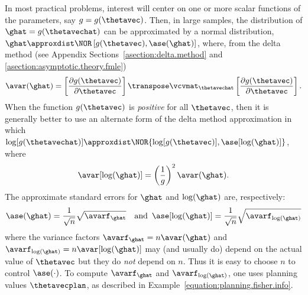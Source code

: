 In most practical problems, interest will center on one or more
scalar functions of the parameters, say $g=g(\thetavec)$.  Then, in
large samples, the distribution of $\ghat=g(\thetavechat)$ can be
approximated by a normal distribution, $\ghat \approxdist
\NOR \,[g(\thetavec), \ase(\ghat)]$,
where, from the delta method 
(see Appendix Sections~\ref{asection:delta.method}
and \ref{asection:asymptotic.theory.fmle})
\begin{equation}
\label{equation:planning.avar.fun}
 \avar(\ghat)=
\left [\frac{\partial g(\thetavec)}{\partial \thetavec }
 \right ] \transpose \vcvmat_{\thetavechat}
\left [\frac{\partial g(\thetavec)}{\partial \thetavec } \right ].
\end{equation}
When the function $g(\thetavec)$ is {\em positive} for all
$\thetavec$, then it is generally better to use an alternate form of
the delta method approximation in which $\log[g(\thetavechat)]
\approxdist
\NOR \{\log[g(\thetavec)], \ase[\log(\ghat)]\}$,
where 
\begin{displaymath}
\avar[\log(\ghat)]=\left (\frac{1}{g} \right )^{2}
\avar(\ghat).
\end{displaymath}
The approximate standard errors for $\ghat$
and $\log(\ghat)$ are, respectively:
\begin{eqnarray*}
\ase(\ghat)=\frac{1}{\sqrt{n}} \sqrt{\avarf_{\ghat}} \quad \mbox{and}
\,\,\, \ase[\log(\ghat)]=\frac{1}{\sqrt{n}} \sqrt{\avarf_{\log(\ghat)}}
\end{eqnarray*}
where the variance factors $\avarf_{\ghat}=n\avar(\ghat)$ and
$\avarf_{\log(\ghat)} = n \avar[\log(\ghat)]$ may (and usually do)
depend on the actual value of $\thetavec$ but they do {\em not}
depend on $n$.  Thus it is easy to choose $n$ to control
$\ase(\cdot)$.  To compute $\avarf_{\ghat}$ and
$\avarf_{\log(\ghat)}$, one uses planning values $\thetavecplan$, as
described in Example~\ref{equation:planning.fisher.info}.

